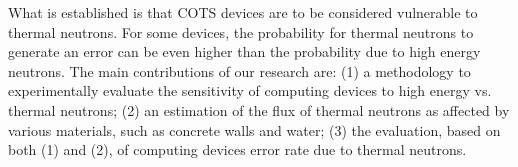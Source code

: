 What is established is that COTS devices are to be considered vulnerable to thermal neutrons. For some devices, the probability for thermal neutrons to generate an error can be even higher than the probability due to high energy neutrons.  
The main contributions of our research are: (1) a methodology to experimentally evaluate the sensitivity of computing devices to high energy vs. thermal neutrons; (2) an estimation of the flux of thermal neutrons as affected by various materials, such as concrete walls and water; (3) the evaluation, based on both (1) and (2), of computing devices error rate due to thermal neutrons. 



